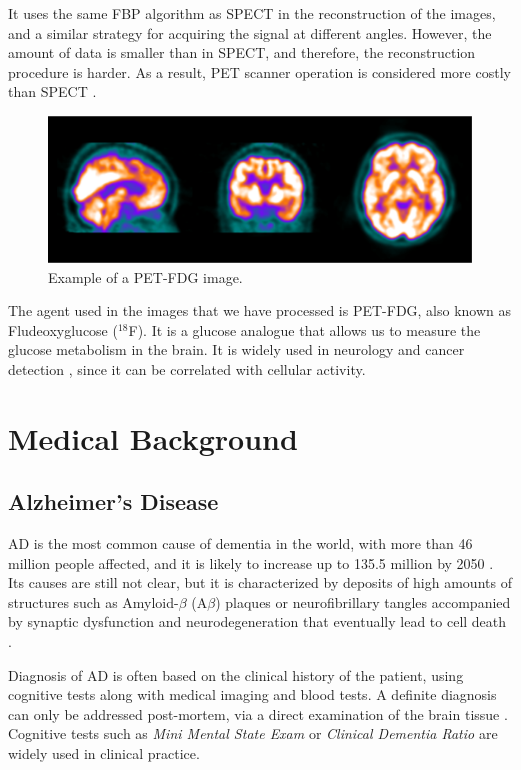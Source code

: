 It uses the same \ac{FBP} algorithm as \ac{SPECT} in the reconstruction of the images, and a similar strategy for acquiring the signal at different angles. However, the amount of data is smaller than in \ac{SPECT}, and therefore, the reconstruction procedure is harder. As a result, \ac{PET} scanner operation is considered more costly than \ac{SPECT} \cite{Carlson2016}.  

\begin{figure}[htp]
	\centering
	\includegraphics[width=0.7\linewidth]{Graphics/ch2/example_PET}
	\caption[Example of a PET-FDG image.]{Example of a PET-FDG image.}
	\label{fig:example_PET}
\end{figure}

The agent used in the images that we have processed is PET-FDG, also known as Fludeoxyglucose ($^{18}$F). It is a glucose analogue that allows us to measure the glucose metabolism in the brain. It is widely used in neurology \cite{Newberg2002} and cancer detection \cite{Kelloff2005}, since it can be correlated with cellular activity. 

\section{Medical Background}\label{sec:disorders}
\subsection{Alzheimer's Disease}
\acf{AD} is the most common cause of dementia in the world, with more than 46 million people affected, and it is likely to increase up to 135.5 million by 2050 \cite{Association2016}. Its causes are still not clear, but it is characterized by deposits of high amounts of structures such as Amyloid-$\beta$ (A$\beta$) plaques or neurofibrillary tangles accompanied by synaptic dysfunction and neurodegeneration that eventually lead to cell death \cite{Ballard2011,Sevigny2016}.

Diagnosis of \ac{AD} is often based on the clinical history of the patient, using cognitive tests along with medical imaging and blood tests. A definite diagnosis can only be addressed post-mortem, via a direct examination of the brain tissue \cite{Ballard2011}. Cognitive tests such as \textit{Mini Mental State Exam} or \textit{Clinical Dementia Ratio} are widely used in clinical practice. 

